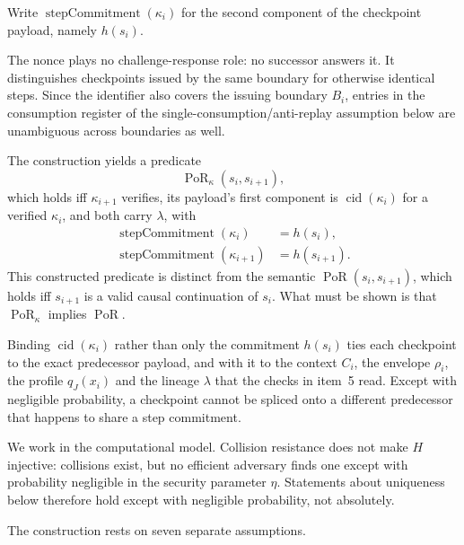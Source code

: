 \documentclass[10pt,twocolumn]{article}
\newcommand{\PoR}{\operatorname{PoR}}
\begin{document}
Write \(\operatorname{stepCommitment}(\kappa_i)\) for the second component of
the checkpoint payload, namely \(h(s_i)\).

The nonce plays no challenge-response role: no successor answers it. It
distinguishes checkpoints issued by the same boundary for otherwise identical
steps. Since the identifier also covers the issuing boundary \(B_i\), entries in
the consumption register of the single-consumption/anti-replay assumption below
are unambiguous across boundaries as well.

The construction yields a predicate
\[
\PoR_\kappa(s_i,s_{i+1}),
\]
which holds iff \(\kappa_{i+1}\) verifies, its payload's first component is
\(\operatorname{cid}(\kappa_i)\) for a verified \(\kappa_i\), and both carry
\(\lambda\), with
\[
\begin{aligned}
\operatorname{stepCommitment}(\kappa_i)
&=h(s_i),\\
\operatorname{stepCommitment}(\kappa_{i+1})
&=h(s_{i+1}).
\end{aligned}
\]
This constructed predicate is distinct from the semantic \(\PoR(s_i,s_{i+1})\), which
holds iff \(s_{i+1}\) is a valid causal continuation of \(s_i\). What must be
shown is that \(\PoR_\kappa\) implies \(\PoR\).

Binding \(\operatorname{cid}(\kappa_i)\) rather than only the commitment
\(h(s_i)\) ties each checkpoint to the exact predecessor payload, and with it to the context
\(C_i\), the envelope \(\rho_i\), the profile \(q_J(x_i)\) and the lineage
\(\lambda\) that the checks in item~5 read. Except with negligible probability,
a checkpoint cannot be spliced onto a different predecessor that happens to
share a step commitment.

We work in the computational model. Collision resistance does not make \(H\)
injective: collisions exist, but no efficient adversary finds one except with
probability negligible in the security parameter \(\eta\). Statements about
uniqueness below therefore hold except with negligible probability, not
absolutely.

The construction rests on seven separate assumptions.
\end{document}
